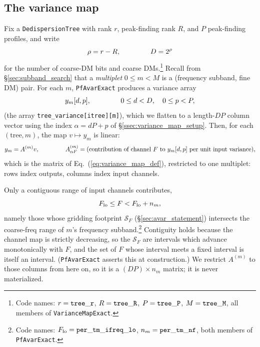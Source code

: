 \documentclass{article}
\numberwithin{equation}{section}   %
\begin{document}
\subsection{The variance map}
\label{ssec:svd_exact_map}

Fix a {\tt DedispersionTree} with rank $r$, peak-finding rank $R$, and $P$ peak-finding
profiles, and write
\begin{equation}
\rho = r-R, \hspace{1.5cm} D = 2^\rho
\end{equation}
for the number of coarse-DM bits and coarse DMs.\footnote{Code names: $r = {\tt tree\_r}$,
$R = {\tt tree\_R}$, $P = {\tt tree\_P}$, $M = {\tt tree\_M}$, all members of
{\tt VarianceMapExact}.}
Recall from \S\ref{sec:subband_search} that a {\em multiplet} $0 \le m < M$ is a
(frequency subband, fine DM) pair. For each $m$, {\tt PfAvarExact} produces a variance array
\begin{equation}
y_m[d,p], \hspace{1.5cm} 0 \le d < D, \quad 0 \le p < P,
\end{equation}
(the array {\tt tree\_variance[itree][m]}), which we flatten to a length-$DP$ column vector
using the index $\alpha = dP + p$ of \S\ref{ssec:variance_map_setup}. Then, for each
$(\mbox{tree}, m)$, the map $v \mapsto y_m$ is linear:
\begin{equation}
y_m = A^{(m)} v, \hspace{1.5cm} A^{(m)}_{\alpha F} = \mbox{(contribution of channel $F$ to $y_m[d,p]$
per unit input variance)},
\label{eq:svdx_map}
\end{equation}
which is the matrix of Eq.\ (\ref{eq:variance_map_def}), restricted to one multiplet: rows index
outputs, columns index input channels.

Only a contiguous range of input channels contributes,
\begin{equation}
F_{\rm lo} \le F < F_{\rm lo} + n_m,
\label{eq:svdx_support}
\end{equation}
namely those whose gridding footprint ${\mathcal S}_F$ (\S\ref{sec:avar_statement}) intersects
the coarse-freq range of $m$'s frequency subband.\footnote{Code names: $F_{\rm lo} =
{\tt per\_tm\_ifreq\_lo}$, $n_m = {\tt per\_tm\_nf}$, both members of {\tt PfAvarExact}.}
Contiguity holds because the channel map is strictly decreasing, so the ${\mathcal S}_F$ are
intervals which advance monotonically with $F$, and the set of $F$ whose interval meets a fixed
interval is itself an interval. ({\tt PfAvarExact} asserts this at construction.) We restrict
$A^{(m)}$ to those columns from here on, so it is a $(DP) \times n_m$ matrix; it is never
materialized.
\end{document}
